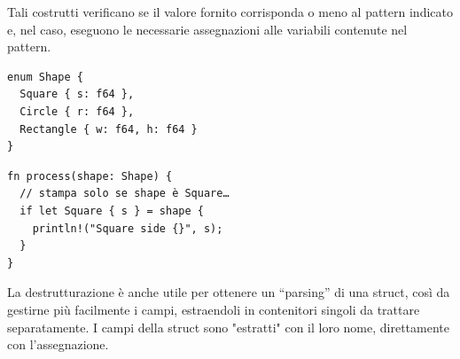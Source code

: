 Tali costrutti verificano se il valore fornito corrisponda o meno al pattern indicato e, nel caso,
eseguono le necessarie assegnazioni alle variabili contenute nel pattern.


\begin{center}
  \centering
  \begin{minipage}{\linewidth}
    \begin{minipage}{0.47\linewidth}

      \begin{verbatim}
enum Shape {
  Square { s: f64 },
  Circle { r: f64 },
  Rectangle { w: f64, h: f64 }
}
\end{verbatim}

    \end{minipage}%
    \hfill
    \begin{minipage}{\linewidth}
      \begin{minipage}{0.47\linewidth}

        \begin{verbatim}
fn process(shape: Shape) {
  // stampa solo se shape è Square…
  if let Square { s } = shape {
    println!("Square side {}", s);
  }
}
\end{verbatim}
      \end{minipage}
    \end{minipage}
  \end{minipage}
\end{center}





La destrutturazione è anche utile per ottenere un “parsing” di una struct, così da
gestirne più facilmente i campi, estraendoli in contenitori singoli da trattare
separatamente. I campi della struct sono "estratti" con il loro nome, direttamente
con l'assegnazione.



